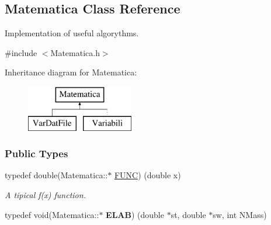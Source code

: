 \hypertarget{classMatematica}{}\subsection{Matematica Class Reference}
\label{classMatematica}


Implementation of useful algorythms.  




{\ttfamily \#include $<$Matematica.\+h$>$}

Inheritance diagram for Matematica\+:\begin{figure}[H]
\begin{center}
\leavevmode
\includegraphics[height=2.000000cm]{classMatematica}
\end{center}
\end{figure}
\subsubsection*{Public Types}
\begin{DoxyCompactItemize}
\item 
typedef double(Matematica\+::$\ast$ \hyperlink{classMatematica_a25c3f9afc44add814e929b99b6b54cfe}{F\+U\+NC}) (double x)\hypertarget{classMatematica_a25c3f9afc44add814e929b99b6b54cfe}{}\label{classMatematica_a25c3f9afc44add814e929b99b6b54cfe}

\begin{DoxyCompactList}\small\item\em A tipical f(x) function. \end{DoxyCompactList}\item 
typedef void(Matematica\+::$\ast$ {\bfseries E\+L\+AB}) (double $\ast$st, double $\ast$sw, int N\+Mass)\hypertarget{classMatematica_a5851cf3fe82e1371ef3719daec522317}{}\label{classMatematica_a5851cf3fe82e1371ef3719daec522317}

\end{DoxyCompactItemize}
